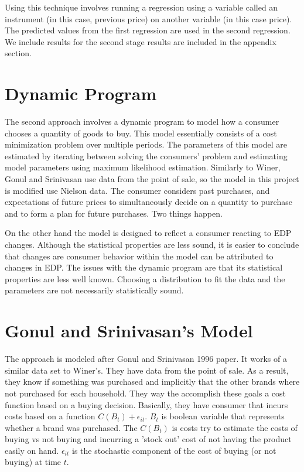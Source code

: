 \documentclass{article}
\begin{document}
Using this technique involves running a regression using a variable called an instrument (in this case, previous price) on another variable (in this case price). The predicted values from the first regression are used in the second regression. We include results for the second stage results are included in the appendix section.\\

\section{Dynamic Program}


The second approach involves a dynamic program to model how a consumer chooses a quantity of goods to buy. This model essentially consists of a cost minimization problem over multiple periods. 
The parameters of this model are estimated by iterating between solving the consumers' problem and estimating model parameters using maximum likelihood estimation. Similarly to Winer, Gonul and Srinivasan use data from the point of sale, so the model in this project is modified use Nielson data. The consumer considers past purchases, and expectations of future prices to simultaneously decide on a quantity to purchase and to form a plan for future purchases. Two things happen.


On the other hand the model is designed to reflect a consumer reacting to EDP changes. Although the statistical properties are less sound, it is easier to conclude that changes are consumer behavior within the model can be attributed to changes in EDP. The issues with the dynamic program are that its statistical properties are less well known. Choosing a distribution to fit the data and the parameters are not necessarily statistically sound.


\section{Gonul and Srinivasan's Model}


The approach is modeled after Gonul and Srinivasan 1996 paper\cite{gonul}. It works of a similar data set to Winer's. They have data from the point of sale. As a result, they know if something was purchased and implicitly that the other brands where not purchased for each household. They way the accomplish these goals a cost function based on a buying decision. Basically, they have consumer that incurs costs based on a function $C(B_t) + \epsilon_{it}$. $B_t$ is boolean variable that represents whether a brand was purchased. The $C(B_t)$ is costs try to estimate the costs of buying vs not buying and incurring a 'stock out' cost of not having the product easily on hand. $\epsilon_{it}$ is the stochastic component of the cost of buying (or not buying)
at time $t$.
\end{document}
